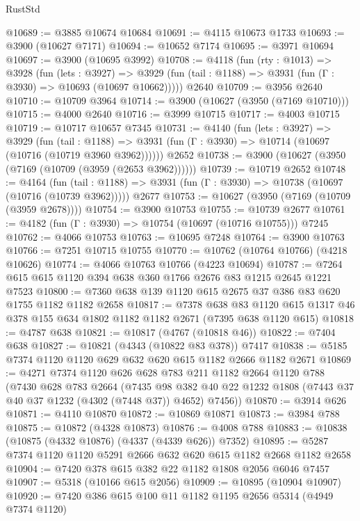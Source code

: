 \begin{lexlean}{RustStd}
\begin{coremodule}
@10689 := @3885 @10674 @10684
@10691 := @4115 @10673 @1733
@10693 := @3900 (@10627 @7171)
@10694 := @10652 @7174
@10695 := @3971 @10694
@10697 := @3900 (@10695 @3992)
@10708 := @4118
    (fun (rty : @1013) =>
    @3928
      (fun (lets : @3927) =>
      @3929 (fun (tail : @1188) => @3931 (fun (Γ : @3930) => @10693 (@10697 @10662)))))
    @2640
@10709 := @3956 @2640
@10710 := @10709 @3964
@10714 := @3900 (@10627 (@3950 (@7169 @10710)))
@10715 := @4000 @2640
@10716 := @3999 @10715
@10717 := @4003 @10715
@10719 := @10717 @10657 @7345
@10731 := @4140
    (fun (lets : @3927) =>
    @3929
      (fun (tail : @1188) =>
      @3931 (fun (Γ : @3930) => @10714 (@10697 (@10716 (@10719 @3960 @3962))))))
    @2652
@10738 := @3900 (@10627 (@3950 (@7169 (@10709 (@3959 (@2653 @3962))))))
@10739 := @10719 @2652
@10748 := @4164
    (fun (tail : @1188) => @3931 (fun (Γ : @3930) => @10738 (@10697 (@10716 (@10739 @3962)))))
    @2677
@10753 := @10627 (@3950 (@7169 (@10709 (@3959 @2678))))
@10754 := @3900 @10753
@10755 := @10739 @2677
@10761 := @4182 (fun (Γ : @3930) => @10754 (@10697 (@10716 @10755))) @7245
@10762 := @4066 @10753
@10763 := @10695 @7248
@10764 := @3900 @10763
@10766 := @7251 @10715 @10755
@10770 := @10762 (@10764 @10766) (@4218 @10626)
@10774 := @4066 @10763 @10766 (@4223 @10694)
@10787 := @7264 @615 @615 @1120 @394 @638 @360 @1766 @2676 @83 @1215 @2645 @1221 @7523
@10800 := @7360 @638 @139 @1120 @615 @2675 @37 @386 @83 @620 @1755 @1182 @1182 @2658
@10817 := @7378
    @638
    @83
    @1120
    @615
    @1317
    @46
    @378
    @155
    @634
    @1802
    @1182
    @1182
    @2671
    (@7395 @638 @1120 @615)
@10818 := @4787 @638
@10821 := @10817 (@4767 (@10818 @46))
@10822 := @7404 @638
@10827 := @10821 (@4343 (@10822 @83 @378)) @7417
@10838 := @5185 @7374 @1120 @1120 @629 @632 @620 @615 @1182 @2666 @1182 @2671
@10869 := @4271
    @7374
    @1120
    @626
    @628
    @783
    @211
    @1182
    @2664
    @1120
    @788
    (@7430
      @628
      @783
      @2664
      (@7435
        @98
        @382
        @40
        @22
        @1232
        @1808
        (@7443 @37 @40 @37 @1232 (@4302 (@7448 @37)) @4652)
        @7456))
@10870 := @3914 @626
@10871 := @4110 @10870
@10872 := @10869 @10871
@10873 := @3984 @788
@10875 := @10872 (@4328 @10873)
@10876 := @4008 @788
@10883 := @10838 (@10875 (@4332 @10876) (@4337 (@4339 @626)) @7352)
@10895 := @5287 @7374 @1120 @1120 @5291 @2666 @632 @620 @615 @1182 @2668 @1182 @2658
@10904 := @7420 @378 @615 @382 @22 @1182 @1808 @2056 @6046 @7457
@10907 := @5318 (@10166 @615 @2056)
@10909 := @10895 (@10904 @10907)
@10920 := @7420 @386 @615 @100 @11 @1182 @1195 @2656 @5314 (@4949 @7374 @1120)

\end{coremodule}
\end{lexlean}
